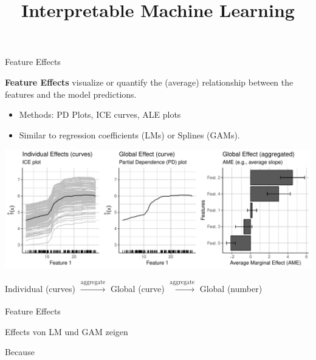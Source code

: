 \documentclass[11pt,compress,t,notes=noshow, xcolor=table]{beamer}
\title{Interpretable Machine Learning}
\institute{\href{https://compstat-lmu.github.io/lecture_iml/}{compstat-lmu.github.io/lecture\_iml}}
\date{}
\begin{document}





\begin{vbframe}{Feature Effects}

\textbf{Feature Effects} visualize or quantify the (average) relationship between the features and the model predictions. %
\begin{itemize}
\item Methods: PD Plots, ICE curves, ALE plots
\item Similar to regression coefficients (LMs) or Splines (GAMs).
\end{itemize}

\centerline{\includegraphics[width=\textwidth]{figure_man/feature-effects.pdf}}

\hspace{8px} \small Individual (curves) \hspace{2px}
$\xrightarrow[]{\text{aggregate}}$ \hspace{2px} Global (curve) \hspace{2px}
$\xrightarrow[]{\text{aggregate}}$ \hspace{2px} Global (number)



\lz

\end{vbframe}



\begin{vbframe}{Feature Effects}

Effects von LM und GAM zeigen

Because

\end{vbframe}
\end{document}
